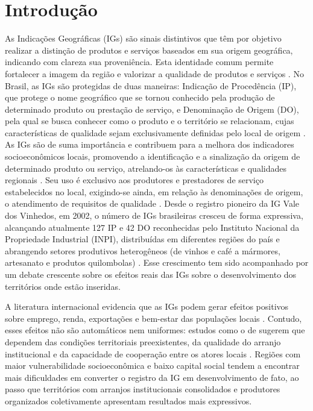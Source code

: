 \documentclass[12pt, a4paper]{article}
\begin{document}
\newpage
\tableofcontents
\newpage

\section{Introdução}

As Indicações Geográficas (IGs) são sinais distintivos que têm por objetivo realizar a distinção de produtos e serviços baseados em sua origem geográfica, indicando com clareza sua proveniência. Esta identidade comum permite fortalecer a imagem da região e valorizar a qualidade de produtos e serviços \citep{inpi2026}. No Brasil, as IGs são protegidas de duas maneiras: Indicação de Procedência (IP), que protege o nome geográfico que se tornou conhecido pela produção de determinado produto ou prestação de serviço, e Denominação de Origem (DO), pela qual se busca conhecer como o produto e o território se relacionam, cujas características de qualidade sejam exclusivamente definidas pelo local de origem \citep{barbosa2010}. As IGs são de suma importância e contribuem para a melhora dos indicadores socioeconômicos locais, promovendo a identificação e a sinalização da origem de determinado produto ou serviço, atrelando-os às características e qualidades regionais \citep{artencio2019}. Seu uso é exclusivo aos produtores e prestadores de serviço estabelecidos no local, exigindo-se ainda, em relação às denominações de origem, o atendimento de requisitos de qualidade \citep{brasil1996}. Desde o registro pioneiro da IG Vale dos Vinhedos, em 2002, o número de IGs brasileiras cresceu de forma expressiva, alcançando atualmente 127 IP e 42 DO reconhecidas pelo Instituto Nacional da Propriedade Industrial (INPI), distribuídas em diferentes regiões do país e abrangendo setores produtivos heterogêneos (de vinhos e café a mármores, artesanato e produtos quilombolas) \citep{inpi2026}. Esse crescimento tem sido acompanhado por um debate crescente sobre os efeitos reais das IGs sobre o desenvolvimento dos territórios onde estão inseridas.

A literatura internacional evidencia que as IGs podem gerar efeitos positivos sobre emprego, renda, exportações e bem-estar das populações locais \citep{medeiros2021raiher, belletti2017}. Contudo, esses efeitos não são automáticos nem uniformes: estudos como o de \citet{vaquero2021} sugerem que dependem das condições territoriais preexistentes, da qualidade do arranjo institucional e da capacidade de cooperação entre os atores locais \citep{maiorki2015}. Regiões com maior vulnerabilidade socioeconômica e baixo capital social tendem a encontrar mais dificuldades em converter o registro da IG em desenvolvimento de fato, ao passo que territórios com arranjos institucionais consolidados e produtores organizados coletivamente apresentam resultados mais expressivos.
\end{document}
